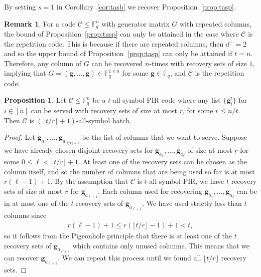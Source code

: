 \documentclass[11pt,a4paper]{article}
\theoremstyle{definition}
\newtheorem{proposition}[theorem]{Proposition}
\newtheorem{remark}[theorem]{Remark}
\newcommand{\bfg}{{\boldsymbol g}}
\newcommand{\F}{\mathbb{F}}
\newcommand{\mC}{\mathcal{C}}
\begin{document}
By setting $s=1$ in Corollary~\ref{cor:tasb} we recover Proposition~\ref{prop:tasp}.



\begin{remark}
For a code $\mC \le \F_q^n$ with generator matrix $G$ with repeated columns, the bound of Proposition~\ref{prop:tasp} can only be attained in the case where $\mC$ is the repetition code. This is because if there are repeated columns, then $d^\perp=2$ and so the upper bound of Proposition~\ref{prop:tasp} can only be attained if $t=n$. Therefore, any column of $G$ can be recovered $n$-times with recovery sets of size $1$, implying that $G=(\bfg,\dots,\bfg) \in \F_q^{1 \times n}$ for some $\bfg \in \F_q$, and $\mC$ is the repetition code.
\end{remark}


\begin{proposition} \label{prop:jon}
Let $\mC \le \F_q^n$ be a $t$-all-symbol PIR code where any list $\{\bfg_i^t\}$ for $i \in [n]$ can be served with recovery sets of size at most $r$, for some $r \le n/t$. Then $\mC$ is $(\lfloor t/r\rfloor+1)$-all-symbol batch.
\end{proposition}
\begin{proof}
Let $\bfg_{a_1},\dots,\bfg_{a_{\lfloor t/r\rfloor+1}}$ be the list of columns that we want to serve. Suppose we have already chosen disjoint recovery sets for $\bfg_{a_1},\dots,\bfg_{a_\ell}$ of size at most $r$ for some $0 \le \ell < \lfloor t/r\rfloor+1$. At least one of the recovery sets can be chosen as the column itself, and so the number of columns that are being used so far is at most $r(\ell-1)+1$. By the assumption that $\mC$ is $t$-all-symbol PIR, we have $t$ recovery sets of size at most $r$ for $\bfg_{a_{\ell+1}}$. Each column used for recovering $\bfg_{a_1},\dots,\bfg_{a_\ell}$ can be in at most one of the $t$ recovery sets of $\bfg_{a_{\ell+1}}$. We have used strictly less than $t$ columns since
\begin{align*}
    r(\ell-1)+1 \le r\left(\lfloor t/r\rfloor-1\right)+1 < t,
\end{align*}
so it follows from the Pigeonhole principle that there is at least one of the $t$ recovery sets of $\bfg_{a_{\ell+1}}$ which contains only unused columns. This means that we can recover $\bfg_{a_{\ell+1}}$. We can repeat this process until we found all $\lfloor t/r\rfloor$ recovery sets.
\end{proof}
\end{document}
